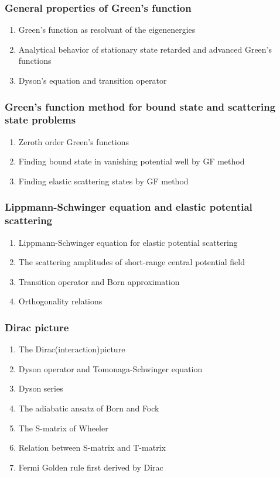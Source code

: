 \documentclass[12pt]{article}
\numberwithin{equation}{section}
\begin{document}
\subsubsection{General properties of Green's function}
\begin{enumerate}
\item Green's function as resolvant of the eigenenergies
\item Analytical behavior of stationary state retarded and advanced Green's functions
\item Dyson's equation and transition operator
\end{enumerate}
\subsubsection{Green's function method for bound state and scattering state problems}
\begin{enumerate}
\item Zeroth order Green's functions
\item Finding bound state in vanishing potential well by GF method
\item Finding elastic scattering states by GF method
\end{enumerate}
\subsubsection{Lippmann-Schwinger equation and elastic potential scattering}
\begin{enumerate}
\item Lippmann-Schwinger equation for elastic potential scattering
\item The scattering amplitudes of short-range central potential field
\item Transition operator and Born approximation
\item Orthogonality relations
\end{enumerate}
\subsubsection{Dirac picture}
\begin{enumerate}
\item The Dirac(interaction)picture
\item Dyson operator and Tomonaga-Schwinger equation
\item Dyson series
\item The adiabatic ansatz of Born and Fock
\item The S-matrix of Wheeler
\item Relation between S-matrix and T-matrix
\item Fermi Golden rule first derived by Dirac
\end{enumerate}
\end{document}
